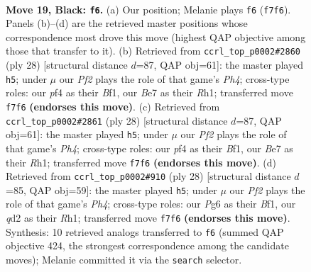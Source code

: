 \documentclass[11pt]{article}
\begin{document}
\clearpage

\begin{figure}[p]\centering
\begin{subfigure}{0.46\textwidth}\centering
\resizebox{\linewidth}{!}{%
\newchessgame
\chessboard[
  setfen={rnr3k1/ppp1bp2/q5p1/P2pNb2/3P1P2/1P2P1P1/3Q4/RNB2RK1 b - - 1 19},
  showmover=false,
  pgfstyle=straightmove, color=movearrow, markmove={f7-f6}
]}
\caption{}
\end{subfigure}\hfill
\begin{subfigure}{0.46\textwidth}\centering
\resizebox{\linewidth}{!}{%
\newchessgame
\chessboard[
  setfen={r1b1k2r/ppp1q2p/1n1p2p1/3Pp3/2P4P/2N1Q3/PP3PP1/R3KB1R w KQkq - 2 15},
  showmover=false,
  pgfstyle=straightmove, color=movearrow, markmove={h4-h5}
]}
\caption{}
\end{subfigure}
\\[4pt]
\begin{subfigure}{0.46\textwidth}\centering
\resizebox{\linewidth}{!}{%
\newchessgame
\chessboard[
  setfen={r1b1k2r/ppp1q2p/1n1p2p1/3Pp3/2P4P/2N1Q3/PP3PP1/R3KB1R w KQkq - 2 15},
  showmover=false,
  pgfstyle=straightmove, color=movearrow, markmove={h4-h5}
]}
\caption{}
\end{subfigure}\hfill
\begin{subfigure}{0.46\textwidth}\centering
\resizebox{\linewidth}{!}{%
\newchessgame
\chessboard[
  setfen={r2qk2r/ppp4p/1n1p2p1/3Ppb2/2P4P/2N1Q3/PP3PP1/R3KB1R w KQkq - 2 15},
  showmover=false,
  pgfstyle=straightmove, color=movearrow, markmove={h4-h5}
]}
\caption{}
\end{subfigure}
\caption{\textbf{Move 19, Black: \texttt{f6}.} (a) Our position; Melanie plays \texttt{f6} (\texttt{f7f6}). Panels (b)--(d) are the retrieved master positions whose correspondence most drove this move (highest QAP objective among those that transfer to it). (b) Retrieved from \texttt{ccrl\_top\_p0002\#2860} (ply 28) [structural distance $d$=87, QAP obj=61]: the master played \texttt{h5}; under $\mu$ our \emph{Pf2} plays the role of that game's \emph{Ph4}; cross-type roles: our \emph{p}f4 as their \emph{B}f1, our \emph{B}e7 as their \emph{R}h1; transferred move \texttt{f7f6} \textbf{(endorses this move)}. (c) Retrieved from \texttt{ccrl\_top\_p0002\#2861} (ply 28) [structural distance $d$=87, QAP obj=61]: the master played \texttt{h5}; under $\mu$ our \emph{Pf2} plays the role of that game's \emph{Ph4}; cross-type roles: our \emph{p}f4 as their \emph{B}f1, our \emph{B}e7 as their \emph{R}h1; transferred move \texttt{f7f6} \textbf{(endorses this move)}. (d) Retrieved from \texttt{ccrl\_top\_p0002\#910} (ply 28) [structural distance $d$=85, QAP obj=59]: the master played \texttt{h5}; under $\mu$ our \emph{Pf2} plays the role of that game's \emph{Ph4}; cross-type roles: our \emph{P}g6 as their \emph{B}f1, our \emph{q}d2 as their \emph{R}h1; transferred move \texttt{f7f6} \textbf{(endorses this move)}. Synthesis: 10 retrieved analogs transferred to \texttt{f6} (summed QAP objective 424, the strongest correspondence among the candidate moves); Melanie committed it via the \texttt{search} selector.}
\label{fig:thought-m37}
\end{figure}
\end{document}
